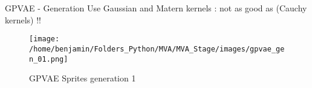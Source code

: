 \begin{frame}{GPVAE - Generation}
    Use Gaussian and Matern kernels : not as good as \cite{li_disentangled_2018} (Cauchy kernels) !!
    \begin{figure}[H]
        \centering
        \texttt{[image: /home/benjamin/Folders\_Python/MVA/MVA\_Stage/images/gpvae\_gen\_01.png]}
        \caption{GPVAE Sprites generation 1}
        \label{fig:GPVAE Sprites generation 1}
    \end{figure}
\end{frame}
